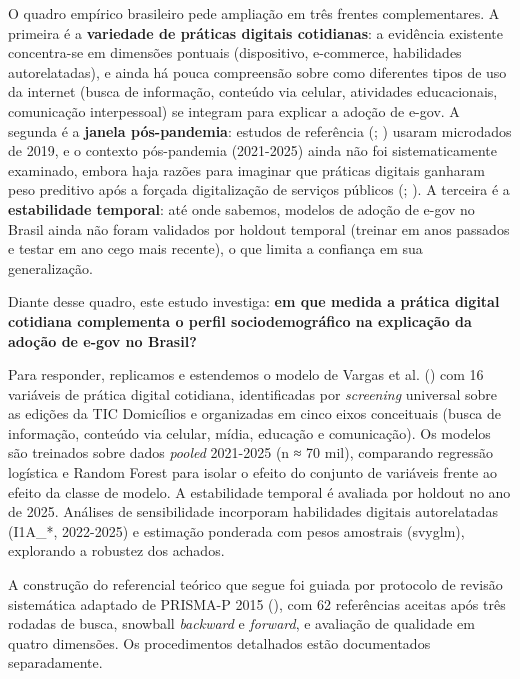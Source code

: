 \documentclass[
  man,
  floatsintext,
  longtable,
  a4paper,
  nolmodern,
  notxfonts,
  notimes,
  colorlinks=true,linkcolor=blue,citecolor=blue,urlcolor=blue]{apa7}
\begin{document}
O quadro empírico brasileiro pede ampliação em três frentes
complementares. A primeira é a \textbf{variedade de práticas digitais
cotidianas}: a evidência existente concentra-se em dimensões pontuais
(dispositivo, e-commerce, habilidades autorelatadas), e ainda há pouca
compreensão sobre como diferentes tipos de uso da internet (busca de
informação, conteúdo via celular, atividades educacionais, comunicação
interpessoal) se integram para explicar a adoção de e-gov. A segunda é a
\textbf{janela pós-pandemia}: estudos de referência
(;
) usaram microdados de
2019, e o contexto pós-pandemia (2021-2025) ainda não foi
sistematicamente examinado, embora haja razões para imaginar que
práticas digitais ganharam peso preditivo após a forçada digitalização
de serviços públicos (;
). A terceira é a
\textbf{estabilidade temporal}: até onde sabemos, modelos de adoção de
e-gov no Brasil ainda não foram validados por holdout temporal (treinar
em anos passados e testar em ano cego mais recente), o que limita a
confiança em sua generalização.

Diante desse quadro, este estudo investiga: \textbf{em que medida a
prática digital cotidiana complementa o perfil sociodemográfico na
explicação da adoção de e-gov no Brasil?}

Para responder, replicamos e estendemos o modelo de Vargas et al.
() com 16 variáveis de prática digital
cotidiana, identificadas por \emph{screening} universal sobre as edições
da TIC Domicílios e organizadas em cinco eixos conceituais (busca de
informação, conteúdo via celular, mídia, educação e comunicação). Os
modelos são treinados sobre dados \emph{pooled} 2021-2025 (n ≈ 70 mil),
comparando regressão logística e Random Forest para isolar o efeito do
conjunto de variáveis frente ao efeito da classe de modelo. A
estabilidade temporal é avaliada por holdout no ano de 2025. Análises de
sensibilidade incorporam habilidades digitais autorelatadas (I1A\_*,
2022-2025) e estimação ponderada com pesos amostrais (svyglm),
explorando a robustez dos achados.

A construção do referencial teórico que segue foi guiada por protocolo
de revisão sistemática adaptado de PRISMA-P 2015
(), com 62
referências aceitas após três rodadas de busca, snowball \emph{backward}
e \emph{forward}, e avaliação de qualidade em quatro dimensões. Os
procedimentos detalhados estão documentados separadamente.
\end{document}
